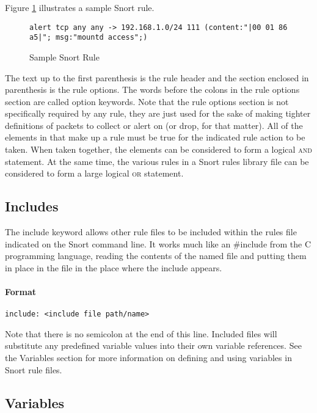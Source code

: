 \documentclass[english]{report}
\begin{document}
Figure \ref{sample snort rule} illustrates a sample Snort rule.

%
\begin{figure}[!hbpt]
\begin{verbatim}
alert tcp any any -> 192.168.1.0/24 111 (content:"|00 01 86 a5|"; msg:"mountd access";)
\end{verbatim}

\caption{Sample Snort Rule\label{sample snort rule}}
\end{figure}


The text up to the first parenthesis is the rule header and the section
enclosed in parenthesis is the rule options. The words before the
colons in the rule options section are called option keywords. Note
that the rule options section is not specifically required by any
rule, they are just used for the sake of making tighter definitions
of packets to collect or alert on (or drop, for that matter). All
of the elements in that make up a rule must be true for the indicated
rule action to be taken. When taken together, the elements can be
considered to form a logical \textsc{and} statement. At the same time,
the various rules in a Snort rules library file can be considered
to form a large logical \textsc{or} statement. 


\subsection{Includes}

The include keyword allows other rule files to be included within
the rules file indicated on the Snort command line. It works much
like an \#include from the C programming language,
reading the contents of the named file and putting them in place in
the file in the place where the include appears.


\paragraph{Format }

\begin{verbatim}
include: <include file path/name>
\end{verbatim}
Note that there is no semicolon at the end of this line. Included
files will substitute any predefined variable values into their own
variable references. See the Variables section for more information
on defining and using variables in Snort rule files.


\subsection{Variables}
\end{document}
